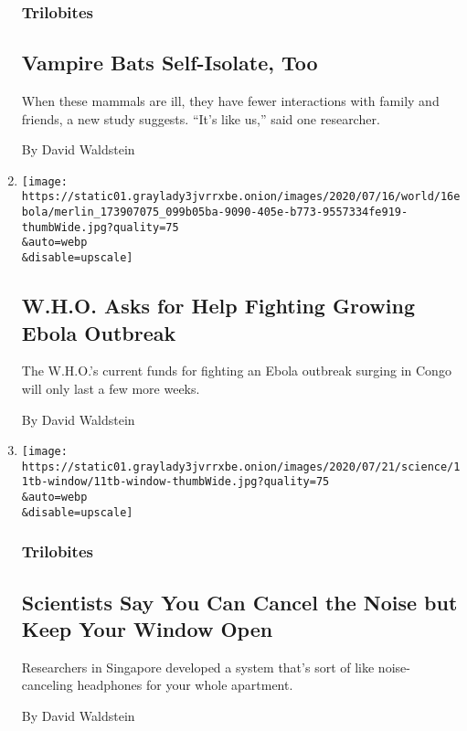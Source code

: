 \begin{enumerate}
  \hypertarget{trilobites}{%
  \subsubsection{Trilobites}\label{trilobites}}

  \hypertarget{vampire-bats-self-isolate-too}{%
  \subsection{Vampire Bats Self-Isolate,
  Too}\label{vampire-bats-self-isolate-too}}

  When these mammals are ill, they have fewer interactions with family
  and friends, a new study suggests. ``It's like us,'' said one
  researcher.

  By David Waldstein
\item
  \href{/2020/07/16/world/africa/ebola-congo-outbreak.html}{}

  \texttt{[image: https://static01.graylady3jvrrxbe.onion/images/2020/07/16/world/16ebola/merlin\_173907075\_099b05ba-9090-405e-b773-9557334fe919-thumbWide.jpg?quality=75\\\&auto=webp\\\&disable=upscale]}

  \hypertarget{who-asks-for-help-fighting-growing-ebola-outbreak}{%
  \subsection{W.H.O. Asks for Help Fighting Growing Ebola
  Outbreak}\label{who-asks-for-help-fighting-growing-ebola-outbreak}}

  The W.H.O.'s current funds for fighting an Ebola outbreak surging in
  Congo will only last a few more weeks.

  By David Waldstein
\item
  \href{/2020/07/11/science/windows-street-noise.html}{}

  \texttt{[image: https://static01.graylady3jvrrxbe.onion/images/2020/07/21/science/11tb-window/11tb-window-thumbWide.jpg?quality=75\\\&auto=webp\\\&disable=upscale]}

  \hypertarget{trilobites-1}{%
  \subsubsection{Trilobites}\label{trilobites-1}}

  \hypertarget{scientists-say-you-can-cancel-the-noise-but-keep-your-window-open}{%
  \subsection{Scientists Say You Can Cancel the Noise but Keep Your
  Window
  Open}\label{scientists-say-you-can-cancel-the-noise-but-keep-your-window-open}}

  Researchers in Singapore developed a system that's sort of like
  noise-canceling headphones for your whole apartment.

  By David Waldstein
\end{enumerate}


